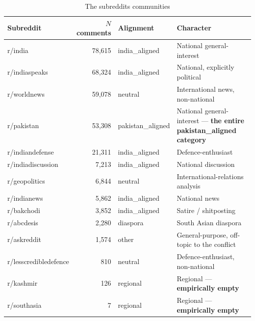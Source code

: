 \begin{table}[h]
  \caption{The subreddits communities}
  \label{tab:communities}
  \small
  \begin{tabular}{@{}lrlp{6.2cm}@{}}
    \toprule
    Subreddit & $N$ comments & Alignment & Character \\
    \midrule
    r/india               & 78{,}615 & india\_aligned    & National general-interest \\
    r/indiaspeaks         & 68{,}324 & india\_aligned    & National, explicitly political \\
    r/worldnews           & 59{,}078 & neutral           & International news, non-national \\
    r/pakistan            & 53{,}308 & pakistan\_aligned & National general-interest --- \textbf{the entire pakistan\_aligned category} \\
    r/indiandefense       & 21{,}311 & india\_aligned    & Defence-enthusiast \\
    r/indiadiscussion     & 7{,}213  & india\_aligned    & National discussion \\
    r/geopolitics         & 6{,}844  & neutral           & International-relations analysis \\
    r/indianews           & 5{,}862  & india\_aligned    & National news \\
    r/bakchodi            & 3{,}852  & india\_aligned    & Satire / shitposting \\
    r/abcdesis            & 2{,}280  & diaspora          & South Asian diaspora \\
    r/askreddit           & 1{,}574  & other             & General-purpose, off-topic to the conflict \\
    r/lesscredibledefence & 810      & neutral           & Defence-enthusiast, non-national \\
    r/kashmir             & 126      & regional          & Regional --- \textbf{empirically empty} \\
    r/southasia           & 7        & regional          & Regional --- \textbf{empirically empty} \\
    \bottomrule
  \end{tabular}
\end{table}
